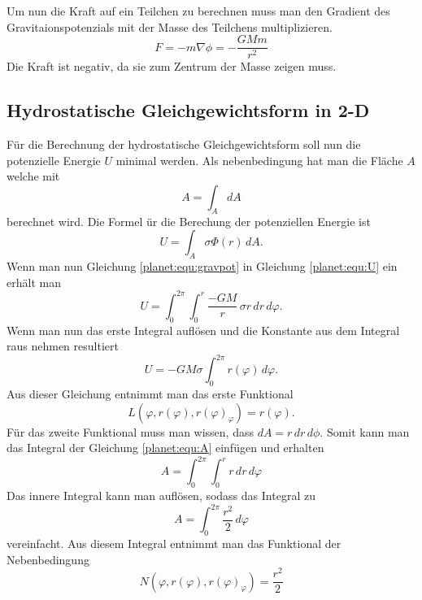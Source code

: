 Um nun die Kraft auf ein Teilchen zu berechnen muss man den Gradient des Gravitaionspotenzials mit der Masse des Teilchens multiplizieren.
\begin{equation}
	F = -m\nabla \phi = -\frac{GMm}{r^2}
\end{equation}
Die Kraft ist negativ, da sie zum Zentrum der Masse zeigen muss.


\subsection{Hydrostatische Gleichgewichtsform in 2-D}
Für die Berechnung der hydrostatische Gleichgewichtsform soll nun die potenzielle Energie \(U\) minimal werden.
Als nebenbedingung hat man die Fläche \(A\) welche mit 
\begin{equation}
	A = \int_{A}^{} dA
	\label{planet:equ:A}
\end{equation}
berechnet wird.
Die Formel ür die Berechung der potenziellen Energie ist
\begin{equation*}
	U = \int_{A} \sigma  \Phi (r) \, dA.
	\label{planet:equ:U}
\end{equation*}
Wenn man nun Gleichung \ref{planet:equ:gravpot} in Gleichung \ref{planet:equ:U} ein erhält man
\begin{equation*}
	U = \int_{0}^{2\pi}\int_{0}^{r} \frac{-GM}{r} \, \sigma r \, dr \, d\varphi.
\end{equation*}
Wenn man nun das erste Integral auflösen und die Konstante aus dem Integral raus nehmen resultiert 
\begin{equation}
	U =-GM\sigma \int_{0}^{2\pi} r(\varphi) \, d\varphi .
\end{equation}
Aus dieser Gleichung entnimmt man das erste Funktional
\begin{equation}
	L(\varphi ,r(\varphi),r(\varphi)_\varphi) = r(\varphi).
\end{equation}
Für das zweite Funktional muss man wissen, dass \(dA = r \, dr \, d\phi\).
Somit kann man das Integral der Gleichung \ref{planet:equ:A} einfügen und erhalten
\begin{equation*}
	A = \int_{0}^{2\pi}\int_{0}^{r} r \, dr \, d\varphi
\end{equation*}
Das innere Integral kann man auflösen, sodass das Integral zu
\begin{equation*}
	A = \int_{0}^{2\pi}\frac{r^2}{2} \, d\varphi
\end{equation*}
vereinfacht.
Aus diesem Integral entnimmt man das Funktional der Nebenbedingung
\begin{equation*}
	N(\varphi ,r(\varphi),r(\varphi)_\varphi) = \frac{r^2}{2} 
\end{equation*}


